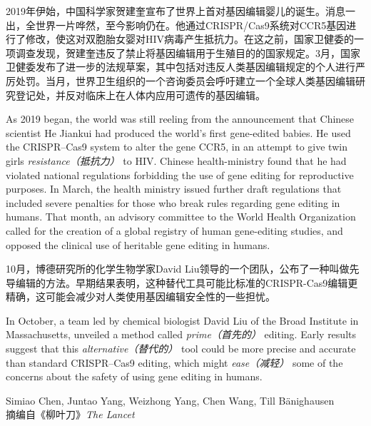 \begin{multicols}{3}
2019年伊始，中国科学家贺建奎宣布了世界上首对基因编辑婴儿的诞生。消息一出，全世界一片哗然，至今影响仍在。他通过CRISPR/Cas9系统对CCR5基因进行了修改，使这对双胞胎女婴对HIV病毒产生抵抗力。在这之前，国家卫健委的一项调查发现，贺建奎违反了禁止将基因编辑用于生殖目的的国家规定。3月，国家卫健委发布了进一步的法规草案，其中包括对违反人类基因编辑规定的个人进行严厉处罚。当月，世界卫生组织的一个咨询委员会呼吁建立一个全球人类基因编辑研究登记处，并反对临床上在人体内应用可遗传的基因编辑。

As 2019 began, the world was still reeling from the announcement that Chinese scientist He Jiankui had produced the world's first gene-edited babies. He used the CRISPR–Cas9 system to alter the gene CCR5, in an attempt to give twin girls \textit{resistance（抵抗力）} to HIV. Chinese health-ministry found that he had violated national regulations forbidding the use of gene editing for reproductive purposes. In March, the health ministry issued further draft regulations that included severe penalties for those who break rules regarding gene editing in humans. That month, an advisory committee to the World Health Organization called for the creation of a global registry of human gene-editing studies, and opposed the clinical use of heritable gene editing in humans.

10月，博德研究所的化学生物学家David Liu领导的一个团队，公布了一种叫做先导编辑的方法。早期结果表明，这种替代工具可能比标准的CRISPR-Cas9编辑更精确，这可能会减少对人类使用基因编辑安全性的一些担忧。

In October, a team led by chemical biologist David Liu of the Broad Institute in Massachusetts, unveiled a method called \textit{prime（首先的）} editing. Early results suggest that this \textit{alternative（替代的）} tool could be more precise and accurate than standard CRISPR–Cas9 editing, which might \textit{ease（减轻）} some of the concerns about the safety of using gene editing in humans.\ \EOA
\end{multicols}
\ADyixuehui
\newpage
{}
\centerline{Simiao Chen, Juntao Yang, Weizhong Yang, Chen Wang, Till B\"anighausen\\
摘编自《柳叶刀》\textit{The Lancet} }
